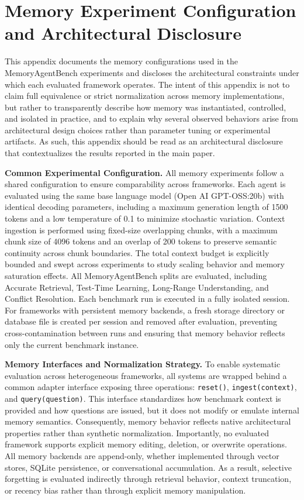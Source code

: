 


\section{Memory Experiment Configuration and Architectural Disclosure}
\label{sec:appendix_memory}



This appendix documents the memory configurations used in the MemoryAgentBench experiments and discloses the architectural constraints under which each evaluated framework operates. The intent of this appendix is not to claim full equivalence or strict normalization across memory implementations, but rather to transparently describe how memory was instantiated, controlled, and isolated in practice, and to explain why several observed behaviors arise from architectural design choices rather than parameter tuning or experimental artifacts. As such, this appendix should be read as an architectural disclosure that contextualizes the results reported in the main paper.

\textbf{Common Experimental Configuration.}
All memory experiments follow a shared configuration to ensure comparability across frameworks. Each agent is evaluated using the same base language model (Open AI GPT-OSS:20b) with identical decoding parameters, including a maximum generation length of 1500 tokens and a low temperature of 0.1 to minimize stochastic variation. Context ingestion is performed using fixed-size overlapping chunks, with a maximum chunk size of 4096 tokens and an overlap of 200 tokens to preserve semantic continuity across chunk boundaries. The total context budget is explicitly bounded and swept across experiments to study scaling behavior and memory saturation effects. All MemoryAgentBench splits are evaluated, including Accurate Retrieval, Test-Time Learning, Long-Range Understanding, and Conflict Resolution. Each benchmark run is executed in a fully isolated session. For frameworks with persistent memory backends, a fresh storage directory or database file is created per session and removed after evaluation, preventing cross-contamination between runs and ensuring that memory behavior reflects only the current benchmark instance.

\textbf{Memory Interfaces and Normalization Strategy.}
To enable systematic evaluation across heterogeneous frameworks, all systems are wrapped behind a common adapter interface exposing three operations: \texttt{reset()}, \texttt{ingest(context)}, and \texttt{query(question)}. This interface standardizes how benchmark context is provided and how questions are issued, but it does not modify or emulate internal memory semantics. Consequently, memory behavior reflects native architectural properties rather than synthetic normalization. Importantly, no evaluated framework supports explicit memory editing, deletion, or overwrite operations. All memory backends are append-only, whether implemented through vector stores, SQLite persistence, or conversational accumulation. As a result, selective forgetting is evaluated indirectly through retrieval behavior, context truncation, or recency bias rather than through explicit memory manipulation.

